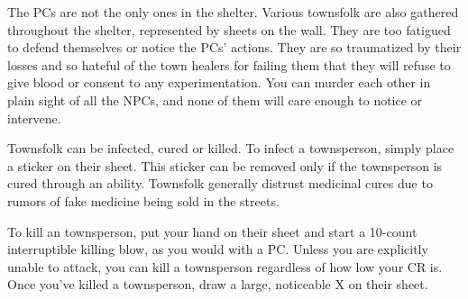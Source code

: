 \documentclass[green]{guildcamp4}
\begin{document}
\name{\gTownsfolk{}}

The PCs are not the only ones in the shelter. Various townsfolk are also gathered throughout the shelter, represented by sheets on the wall. They are too fatigued to defend themselves or notice the PCs' actions. They are so traumatized by their losses and so hateful of the town healers for failing them that they will refuse to give blood or consent to any experimentation. You can murder each other in plain sight of all the NPCs, and none of them will care enough to notice or intervene.

Townsfolk can be infected, cured or killed. To infect a townsperson, simply place a sticker on their sheet. This sticker can be removed only if the townsperson is cured through an ability. Townsfolk generally distrust medicinal cures due to rumors of fake medicine being sold in the streets.

To kill an townsperson, put your hand on their sheet and start a 10-count interruptible killing blow, as you would with a PC. Unless you are explicitly unable to attack, you can kill a townsperson regardless of how low your CR is. Once you've killed a townsperson, draw a large, noticeable X on their sheet.
\end{document}
